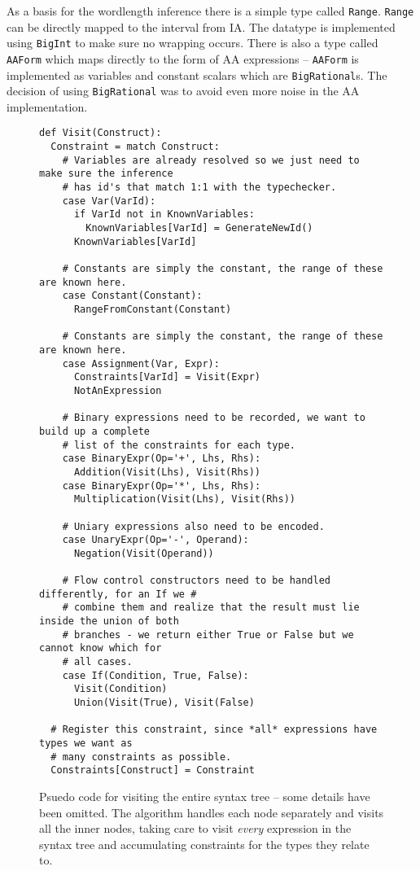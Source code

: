 As a basis for the wordlength inference there is a simple type called \verb+Range+. \verb+Range+ can be directly mapped to the interval from IA. The datatype is implemented using \verb+BigInt+ to make sure no wrapping occurs. There is also a type called \verb+AAForm+ which maps directly to the form of AA expressions -- \verb+AAForm+ is implemented as variables and constant scalars which are \verb+BigRational+s. The decision of using \verb+BigRational+ was to avoid even more noise in the AA implementation.


\begin{figure}
\begin{verbatim}
def Visit(Construct):
  Constraint = match Construct:
    # Variables are already resolved so we just need to make sure the inference
    # has id's that match 1:1 with the typechecker.
    case Var(VarId):
      if VarId not in KnownVariables:
        KnownVariables[VarId] = GenerateNewId()
      KnownVariables[VarId]

    # Constants are simply the constant, the range of these are known here.
    case Constant(Constant):
      RangeFromConstant(Constant)

    # Constants are simply the constant, the range of these are known here.
    case Assignment(Var, Expr):
      Constraints[VarId] = Visit(Expr)
      NotAnExpression

    # Binary expressions need to be recorded, we want to build up a complete
    # list of the constraints for each type.
    case BinaryExpr(Op='+', Lhs, Rhs):
      Addition(Visit(Lhs), Visit(Rhs))
    case BinaryExpr(Op='*', Lhs, Rhs):
      Multiplication(Visit(Lhs), Visit(Rhs))

    # Uniary expressions also need to be encoded.
    case UnaryExpr(Op='-', Operand):
      Negation(Visit(Operand))

    # Flow control constructors need to be handled differently, for an If we #
    # combine them and realize that the result must lie inside the union of both
    # branches - we return either True or False but we cannot know which for
    # all cases.
    case If(Condition, True, False):
      Visit(Condition)
      Union(Visit(True), Visit(False)

  # Register this constraint, since *all* expressions have types we want as
  # many constraints as possible.
  Constraints[Construct] = Constraint
\end{verbatim}
  \caption{Psuedo code for visiting the entire syntax tree -- some details have been omitted. The algorithm handles each node separately and visits all the inner nodes, taking care to visit \textit{every} expression in the syntax tree and accumulating constraints for the types they relate to.}
\label{fig:AstWalker}
\end{figure}


